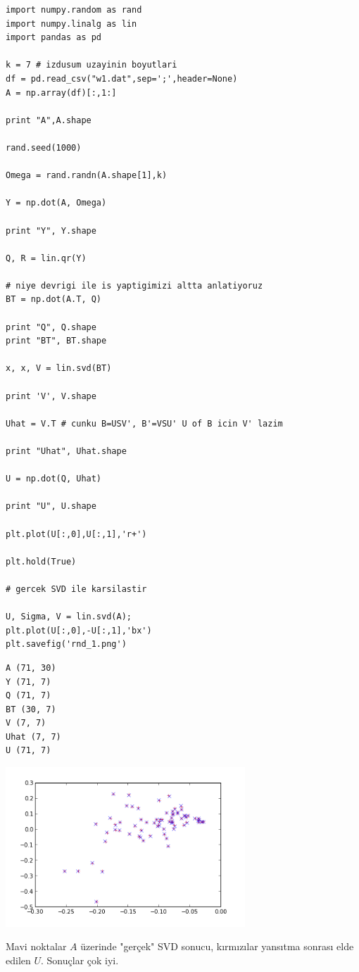 \documentclass[12pt,fleqn]{article}\usepackage{../../common}
\begin{document}
\begin{verbatim}
import numpy.random as rand
import numpy.linalg as lin
import pandas as pd

k = 7 # izdusum uzayinin boyutlari
df = pd.read_csv("w1.dat",sep=';',header=None)
A = np.array(df)[:,1:]

print "A",A.shape

rand.seed(1000)

Omega = rand.randn(A.shape[1],k)

Y = np.dot(A, Omega) 

print "Y", Y.shape

Q, R = lin.qr(Y) 

# niye devrigi ile is yaptigimizi altta anlatiyoruz
BT = np.dot(A.T, Q)

print "Q", Q.shape
print "BT", BT.shape

x, x, V = lin.svd(BT)

print 'V', V.shape

Uhat = V.T # cunku B=USV', B'=VSU' U of B icin V' lazim

print "Uhat", Uhat.shape

U = np.dot(Q, Uhat) 

print "U", U.shape

plt.plot(U[:,0],U[:,1],'r+')

plt.hold(True)
        
# gercek SVD ile karsilastir

U, Sigma, V = lin.svd(A);
plt.plot(U[:,0],-U[:,1],'bx')
plt.savefig('rnd_1.png')
\end{verbatim}

\begin{verbatim}
A (71, 30)
Y (71, 7)
Q (71, 7)
BT (30, 7)
V (7, 7)
Uhat (7, 7)
U (71, 7)
\end{verbatim}

\includegraphics[height=6cm]{rnd_1.png}

Mavi noktalar $A$ üzerinde "gerçek" SVD sonucu, kırmızılar yansıtma
sonrası elde edilen $U$. Sonuçlar çok iyi. 
\end{document}
